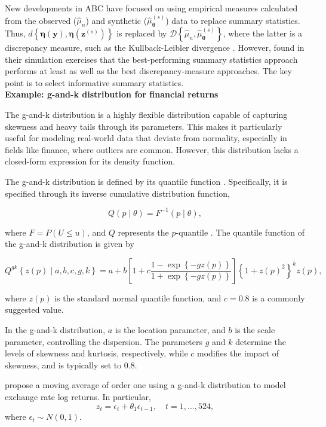 New developments in ABC have focused on using empirical measures calculated from the observed ($\hat{\mu}_n$) and synthetic ($\hat{\mu}_{\boldsymbol{\theta}}^{(s)}$) data to replace summary statistics. Thus, $d\left\{ \boldsymbol\eta ({\boldsymbol y}),{\boldsymbol \eta }({\boldsymbol z}^{(s)})\right\}$ is replaced by $\mathcal{D}\left\{ \hat{\mu}_n,\hat{\mu}_{\boldsymbol{\theta}}^{(s)}\right\}$, where the latter is a discrepancy measure, such as the Kullback-Leibler divergence \cite{jiang2018approximate}. However, \cite{drovandi2022comparison} found in their simulation exercises that the best-performing summary statistics approach performs at least as well as the best discrepancy-measure approaches. The key point is to select informative summary statistics.\\

\textbf{Example: g-and-k distribution for financial returns} 

The g-and-k distribution is a highly flexible distribution capable of capturing skewness and heavy tails through its parameters. This makes it particularly useful for modeling real-world data that deviate from normality, especially in fields like finance, where outliers are common. However, this distribution lacks a closed-form expression for its density function.

The g-and-k distribution is defined by its quantile function \cite{drovandi2011likelihood}. Specifically, it is specified through its inverse cumulative distribution function,

\[
Q(p\mid{\theta}) = F^{-1}(p\mid{\theta}),
\]

where \( F = P(U \leq u) \), and \( Q \) represents the \( p \)-quantile \cite{rayner2002numerical}. The quantile function of the g-and-k distribution is given by

\[
Q^{gk}\left\{z(p)\mid a, b, c, g, k\right\} = a + b\left[1 + c \frac{1 - \exp\left\{-gz(p)\right\}}{1 + \exp\left\{-gz(p)\right\}}\right] \left\{1 + z(p)^2\right\}^k z(p),
\]

where \( z(p) \) is the standard normal quantile function, and \( c = 0.8 \) is a commonly suggested value.

In the g-and-k distribution, \( a \) is the location parameter, and \( b \) is the scale parameter, controlling the dispersion. The parameters \( g \) and \( k \) determine the levels of skewness and kurtosis, respectively, while \( c \) modifies the impact of skewness, and is typically set to 0.8.

\cite{drovandi2011likelihood} propose a moving average of order one using a g-and-k distribution to model exchange rate log returns. In particular,  
\[
z_t = \epsilon_t + \theta_1\epsilon_{t-1}, \quad t=1,\dots,524,
\]  
where \(\epsilon_t \sim N(0,1)\).  

